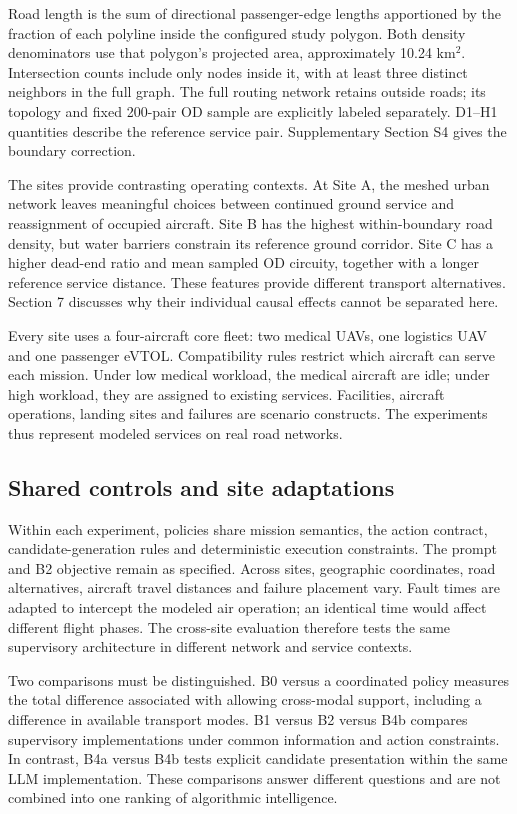 \documentclass[]{interact}
\theoremstyle{plain}
\theoremstyle{definition}
\theoremstyle{remark}
\begin{document}
Road length is the sum of directional passenger-edge lengths apportioned by the fraction of each polyline inside the configured study polygon. Both density denominators use that polygon's projected area, approximately 10.24 km$^2$. Intersection counts include only nodes inside it, with at least three distinct neighbors in the full graph. The full routing network retains outside roads; its topology and fixed 200-pair OD sample are explicitly labeled separately. D1--H1 quantities describe the reference service pair. Supplementary Section S4 gives the boundary correction.

The sites provide contrasting operating contexts. At Site A, the meshed urban network leaves meaningful choices between continued ground service and reassignment of occupied aircraft. Site B has the highest within-boundary road density, but water barriers constrain its reference ground corridor. Site C has a higher dead-end ratio and mean sampled OD circuity, together with a longer reference service distance. These features provide different transport alternatives. Section 7 discusses why their individual causal effects cannot be separated here.

Every site uses a four-aircraft core fleet: two medical UAVs, one logistics UAV and one passenger eVTOL. Compatibility rules restrict which aircraft can serve each mission. Under low medical workload, the medical aircraft are idle; under high workload, they are assigned to existing services. Facilities, aircraft operations, landing sites and failures are scenario constructs. The experiments thus represent modeled services on real road networks.

\subsection{Shared controls and site adaptations}

Within each experiment, policies share mission semantics, the action contract, candidate-generation rules and deterministic execution constraints. The prompt and B2 objective remain as specified. Across sites, geographic coordinates, road alternatives, aircraft travel distances and failure placement vary. Fault times are adapted to intercept the modeled air operation; an identical time would affect different flight phases. The cross-site evaluation therefore tests the same supervisory architecture in different network and service contexts.

Two comparisons must be distinguished. B0 versus a coordinated policy measures the total difference associated with allowing cross-modal support, including a difference in available transport modes. B1 versus B2 versus B4b compares supervisory implementations under common information and action constraints. In contrast, B4a versus B4b tests explicit candidate presentation within the same LLM implementation. These comparisons answer different questions and are not combined into one ranking of algorithmic intelligence.
\end{document}
